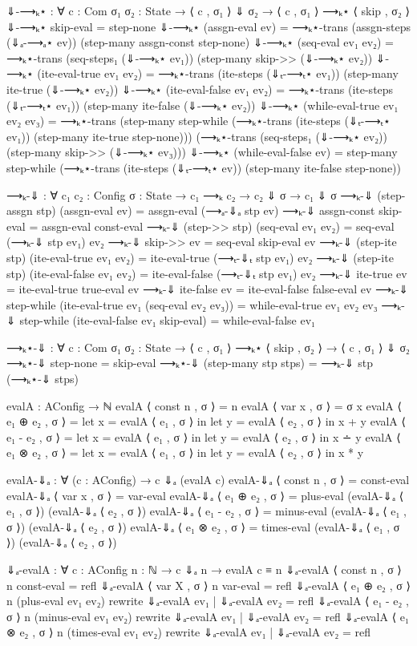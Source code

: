 \documentclass{lecturenotes}
\begin{document}
\begin{code}[hide]
⇓-⟶ₖ⋆ : ∀ {c : Com} {σ₁ σ₂ : State} → ⟨ c , σ₁ ⟩ ⇓ σ₂ → ⟨ c , σ₁ ⟩ ⟶ₖ⋆ ⟨ skip , σ₂ ⟩
⇓-⟶ₖ⋆ skip-eval = step-none
⇓-⟶ₖ⋆ (assgn-eval ev) = ⟶ₖ⋆-trans (assgn-steps (⇓ₐ-⟶ₐ⋆ ev)) (step-many assgn-const step-none)
⇓-⟶ₖ⋆ (seq-eval ev₁ ev₂) = ⟶ₖ⋆-trans (seq-steps₁ (⇓-⟶ₖ⋆ ev₁)) (step-many skip->> (⇓-⟶ₖ⋆ ev₂))
⇓-⟶ₖ⋆ (ite-eval-true ev₁ ev₂) = ⟶ₖ⋆-trans (ite-steps (⇓ₜ-⟶ₜ⋆ ev₁)) (step-many ite-true (⇓-⟶ₖ⋆ ev₂))
⇓-⟶ₖ⋆ (ite-eval-false ev₁ ev₂) = ⟶ₖ⋆-trans (ite-steps (⇓ₜ-⟶ₜ⋆ ev₁)) (step-many ite-false (⇓-⟶ₖ⋆ ev₂))
⇓-⟶ₖ⋆ (while-eval-true ev₁ ev₂ ev₃) = ⟶ₖ⋆-trans (step-many step-while (⟶ₖ⋆-trans (ite-steps (⇓ₜ-⟶ₜ⋆ ev₁)) (step-many ite-true step-none))) (⟶ₖ⋆-trans (seq-steps₁ (⇓-⟶ₖ⋆ ev₂)) (step-many skip->> (⇓-⟶ₖ⋆ ev₃)))
⇓-⟶ₖ⋆ (while-eval-false ev) = step-many step-while (⟶ₖ⋆-trans (ite-steps (⇓ₜ-⟶ₜ⋆ ev)) (step-many ite-false step-none))

⟶ₖ-⇓ : ∀ {c₁ c₂ : Config} {σ : State} → c₁ ⟶ₖ c₂ → c₂ ⇓ σ → c₁ ⇓ σ
⟶ₖ-⇓ (step-assgn stp) (assgn-eval ev) = assgn-eval (⟶ₐ-⇓ₐ stp ev)
⟶ₖ-⇓ assgn-const skip-eval = assgn-eval const-eval
⟶ₖ-⇓ (step->> stp) (seq-eval ev₁ ev₂) = seq-eval (⟶ₖ-⇓ stp ev₁) ev₂
⟶ₖ-⇓ skip->> ev = seq-eval skip-eval ev
⟶ₖ-⇓ (step-ite stp) (ite-eval-true ev₁ ev₂) = ite-eval-true (⟶ₜ-⇓ₜ stp ev₁) ev₂
⟶ₖ-⇓ (step-ite stp) (ite-eval-false ev₁ ev₂) = ite-eval-false (⟶ₜ-⇓ₜ stp ev₁) ev₂
⟶ₖ-⇓ ite-true ev = ite-eval-true true-eval ev
⟶ₖ-⇓ ite-false ev = ite-eval-false false-eval ev
⟶ₖ-⇓ step-while (ite-eval-true ev₁ (seq-eval ev₂ ev₃)) = while-eval-true ev₁ ev₂ ev₃
⟶ₖ-⇓ step-while (ite-eval-false ev₁ skip-eval) = while-eval-false ev₁

⟶ₖ⋆-⇓ : ∀ {c : Com} {σ₁ σ₂ : State} → ⟨ c , σ₁ ⟩ ⟶ₖ⋆ ⟨ skip , σ₂ ⟩ → ⟨ c , σ₁ ⟩ ⇓ σ₂
⟶ₖ⋆-⇓ step-none = skip-eval
⟶ₖ⋆-⇓ (step-many stp stps) = ⟶ₖ-⇓ stp (⟶ₖ⋆-⇓ stps)

evalA : AConfig → ℕ
evalA ⟨ const n , σ ⟩ = n
evalA ⟨ var x , σ ⟩ = σ x
evalA ⟨ e₁ ⊕ e₂ , σ ⟩ = let x = evalA ⟨ e₁ , σ ⟩ in let y = evalA ⟨ e₂ , σ ⟩ in x + y 
evalA ⟨ e₁ - e₂ , σ ⟩ = let x = evalA ⟨ e₁ , σ ⟩ in let y = evalA ⟨ e₂ , σ ⟩ in x ∸ y 
evalA ⟨ e₁ ⊗ e₂ , σ ⟩ = let x = evalA ⟨ e₁ , σ ⟩ in let y = evalA ⟨ e₂ , σ ⟩ in x * y

evalA-⇓ₐ : ∀ (c : AConfig) → c ⇓ₐ (evalA c)
evalA-⇓ₐ ⟨ const n , σ ⟩ = const-eval
evalA-⇓ₐ ⟨ var x , σ ⟩ = var-eval
evalA-⇓ₐ ⟨ e₁ ⊕ e₂ , σ ⟩ = plus-eval (evalA-⇓ₐ ⟨ e₁ , σ ⟩) (evalA-⇓ₐ ⟨ e₂ , σ ⟩)
evalA-⇓ₐ ⟨ e₁ - e₂ , σ ⟩ = minus-eval (evalA-⇓ₐ ⟨ e₁ , σ ⟩) (evalA-⇓ₐ ⟨ e₂ , σ ⟩)
evalA-⇓ₐ ⟨ e₁ ⊗ e₂ , σ ⟩ = times-eval (evalA-⇓ₐ ⟨ e₁ , σ ⟩) (evalA-⇓ₐ ⟨ e₂ , σ ⟩)

⇓ₐ-evalA : ∀ {c : AConfig} {n : ℕ} → c ⇓ₐ n → evalA c ≡ n
⇓ₐ-evalA {⟨ const n , σ ⟩} {n} const-eval = refl
⇓ₐ-evalA {⟨ var X , σ ⟩} {n} var-eval = refl
⇓ₐ-evalA {⟨ e₁ ⊕ e₂ , σ ⟩} {n} (plus-eval ev₁ ev₂) rewrite ⇓ₐ-evalA ev₁ | ⇓ₐ-evalA ev₂ = refl
⇓ₐ-evalA {⟨ e₁ - e₂ , σ ⟩} {n} (minus-eval ev₁ ev₂) rewrite ⇓ₐ-evalA ev₁ | ⇓ₐ-evalA ev₂ = refl
⇓ₐ-evalA {⟨ e₁ ⊗ e₂ , σ ⟩} {n} (times-eval ev₁ ev₂) rewrite ⇓ₐ-evalA ev₁ | ⇓ₐ-evalA ev₂ = refl


\end{code}
\end{document}
